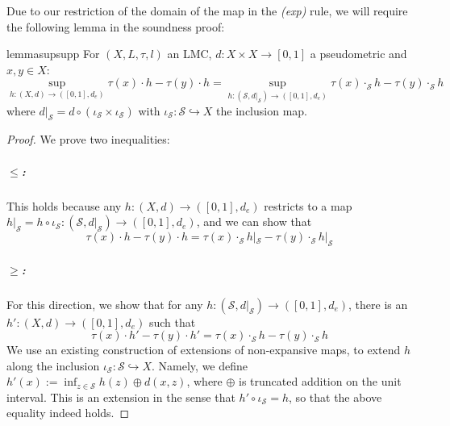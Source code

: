 \documentclass[a4paper,UKenglish,cleveref,autoref,thm-restate]{lipics-v2021}
\newenvironment{proofappendix}[1]{\begin{proof}}{\end{proof}}
\newcommand{\supps}{\mathcal{S}}
\begin{document}
Due to our restriction of the domain of the map in the \emph{(exp)} rule, we will require the following lemma in the soundness proof:
\begin{restatable}{lemma}{supsupp}\label{lem:supsupp}
	For \((X,L,\tau,l)\) an LMC, \(d \colon X \times X \to [0,1]\) a pseudometric and \(x,y \in X\):
	\[
		\sup_{h \colon (X,d) \to ([0,1],d_e)} \tau(x) \cdot h - \tau(y) \cdot h = \sup_{h \colon (\supps,d|_\supps) \to ([0,1],d_e)} \tau(x) \cdot_\supps h - \tau(y) \cdot_\supps h
	\]
	where \(d|_\supps = d \circ (\iota_\supps \times \iota_\supps)\) with \(\iota_\supps \colon \supps \hookrightarrow X\) the inclusion map.
\end{restatable}
\begin{proofappendix}{supsupp}
	We prove two inequalities:
	\subparagraph*{\(\leq\):}
	This holds because any \(h \colon (X,d) \to ([0,1],d_e)\) restricts to a map \(h|_\supps = h \circ \iota_\supps \colon (\supps,d|_\supps) \to ([0,1],d_e)\), and we can show that
	\[
		\tau(x) \cdot h - \tau(y) \cdot h = \tau(x) \cdot_\supps h|_\supps - \tau(y) \cdot_\supps h|_\supps
	\]
	\subparagraph*{\(\geq\):}
	For this direction, we show that for any \(h \colon (\supps, d|_\supps) \to ([0,1],d_e)\), there is an \(h' \colon (X,d) \to ([0,1],d_e)\) such that
	\[
		\tau(x) \cdot h' - \tau(y) \cdot h' = \tau(x) \cdot_\supps h - \tau(y) \cdot_\supps h
	\]
	We use an existing construction of extensions of non-expansive maps, to extend \(h\) along the inclusion \(\iota_\supps \colon \supps \hookrightarrow X\). Namely, we define \(h'(x) := \inf_{z \in \supps} h(z) \oplus d(x,z)\), where \(\oplus\) is truncated addition on the unit interval.
	This is an extension in the sense that \(h' \circ \iota_\supps = h\), so that the above equality indeed holds.
\end{proofappendix}
\end{document}
